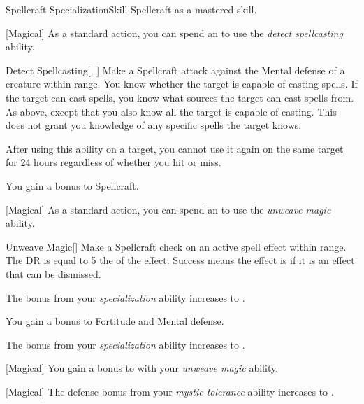     \begin{feat}{Spellcraft Specialization}{Skill}
        \featpre Spellcraft as a mastered skill.

        [Magical] As a standard action, you can spend an  to use the \textit{detect spellcasting} ability.
        \begin{ability}{Detect Spellcasting}[, ]
            Make a Spellcraft attack against the Mental defense of a creature within \rngmed range.
            \hit You know whether the target is capable of casting spells.
            If the target can cast spells, you know what sources the target can cast spells from.
            \crit As above, except that you also know all  the target is capable of casting.
            This does not grant you knowledge of any specific spells the target knows.

            After using this ability on a target, you cannot use it again on the same target for 24 hours regardless of whether you hit or miss.
        \end{ability}

         You gain a  bonus to Spellcraft.

        [Magical] As a standard action, you can spend an  to use the \textit{unweave magic} ability.
        \begin{ability}{Unweave Magic}[]
            Make a Spellcraft check on an active spell effect within \rngmed range.
            The DR is equal to 5 \add the  of the effect.
            Success means the effect is  if it is an effect that can be dismissed.
        \end{ability}

         The bonus from your \textit{specialization} ability increases to .

         You gain a  bonus to Fortitude and Mental defense.

         The bonus from your \textit{specialization} ability increases to .

        [Magical] You gain a  bonus to  with your \textit{unweave magic} ability.

        [Magical] The defense bonus from your \textit{mystic tolerance} ability increases to .
    \end{feat}

